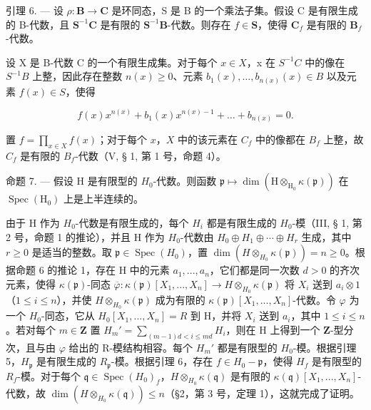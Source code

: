 引理 6. --- 设 \(\rho: \mathbf{B} \to \mathbf{C}\) 是环同态，S 是 B 的一个乘法子集。假设 C 是有限生成的 B-代数，且 \(\mathbf{S}^{-1}\mathbf{C}\) 是有限的 \(\mathbf{S}^{-1}\mathbf{B}\)-代数。则存在 \(f \in \mathbf{S}\)，使得 \(\mathbf{C}_f\) 是有限的 \(\mathbf{B}_f\)-代数。

设 X 是 B-代数 C 的一个有限生成集。对于每个 \(x \in X\)，x 在 \(S^{-1}C\) 中的像在 \(S^{-1}B\) 上整，因此存在整数 \(n(x) \geqslant 0\)、元素 \(b_{1}(x), \ldots, b_{n(x)}(x) \in B\) 以及元素 \(f(x) \in S\)，使得

\[
f (x) x ^ {n (x)} + b _ {1} (x) x ^ {n (x) - 1} + \dots + b _ {n (x)} = 0.
\]

置 \(f = \prod_{x \in X} f(x)\)；对于每个 \(x\)，\(X\) 中的该元素在 \(C_f\) 中的像都在 \(B_f\) 上整，故 \(C_f\) 是有限的 \(B_f\)-代数（V, § 1, 第 1 号，命题 4）。

命题 7. — 假设 H 是有限型的 \(H_{0}\)-代数。则函数 \(\mathfrak{p} \mapsto \dim(\mathrm{H} \otimes_{\mathrm{H}_{0}} \kappa(\mathfrak{p}))\) 在 \(\operatorname{Spec}(\mathrm{H}_{0})\) 上是上半连续的。

由于 H 作为 \(H_{0}\)-代数是有限生成的，每个 \(H_{i}\) 都是有限生成的 \(H_{0}\)-模（III, § 1, 第 2 号，命题 1 的推论），并且 H 作为 \(H_{0}\)-代数由 \(H_{0} \oplus H_{1} \oplus \cdots \oplus H_{r}\) 生成，其中 \(r \geqslant 0\) 是适当的整数。取 \(\mathfrak{p} \in \operatorname{Spec}(H_{0})\)，置 \(\dim(H \otimes_{H_{0}} \kappa(\mathfrak{p})) = n \geqslant 0\)。根据命题 6 的推论 1，存在 H 中的元素 \(a_{1}, ..., a_{n}\)，它们都是同一次数 \(d > 0\) 的齐次元素，使得 \(\kappa(\mathfrak{p})\)-同态 \(\overline{\varphi}: \kappa(\mathfrak{p})[X_{1}, ..., X_{n}] \to H \otimes_{H_{0}} \kappa(\mathfrak{p})\) 将 \(X_{i}\) 送到 \(a_{i} \otimes 1\)（\(1 \leqslant i \leqslant n\)），并使 \(H \otimes_{H_{0}} \kappa(\mathfrak{p})\) 成为有限的 \(\kappa(\mathfrak{p})[X_{1}, ..., X_{n}]\)-代数。令 \(\varphi\) 为一个 \(H_{0}\)-同态，它从 \(H_{0}[X_{1}, ..., X_{n}] = R\) 到 H，并将 \(X_{i}\) 送到 \(a_{i}\)，其中 \(1 \leqslant i \leqslant n\)。若对每个 \(m \in \mathbf{Z}\) 置 \(H_{m}' = \sum_{(m-1)d < i \leqslant md} H_{i}\)，则在 H 上得到一个 \(\mathbf{Z}\)-型分次，且与由 \(\varphi\) 给出的 R-模结构相容。每个 \(H_{m}'\) 都是有限型的 \(H_{0}\)-模。根据引理 5，\(H_{\mathfrak{p}}\) 是有限生成的 \(R_{\mathfrak{p}}\)-模。根据引理 6，存在 \(f \in H_{0} - \mathfrak{p}\)，使得 \(H_{f}\) 是有限型的 \(R_{f}\)-模。对于每个 \(\mathfrak{q} \in \operatorname{Spec}(H_{0})_{f}\)，\(H \otimes_{H_{0}} \kappa(\mathfrak{q})\) 是有限的 \(\kappa(\mathfrak{q})[X_{1}, ..., X_{n}]\)-代数，故 \(\dim(H \otimes_{H_{0}} \kappa(\mathfrak{q})) \leqslant n\)（\S 2，第 3 号，定理 1），这就完成了证明。

